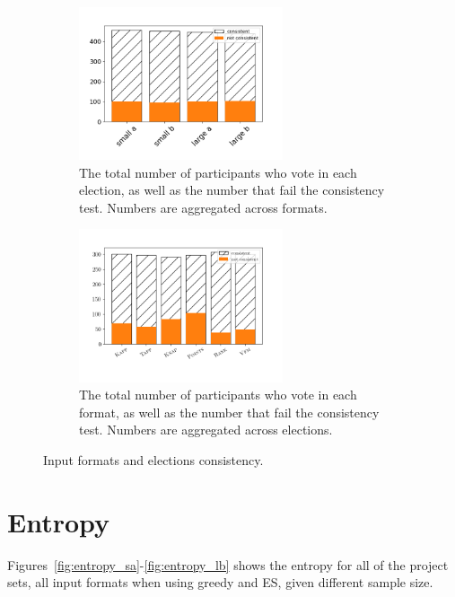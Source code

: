 \documentclass{comsoc2023}
\newcommand{\mes}{ES}
\begin{document}
\begin{figure}[ht!]
     \centering
          \begin{subfigure}[b]{0.45\textwidth}
         \centering
       \includegraphics[width=6cm]{experiment/election_consistency.png}
\caption{The total number of  participants who vote in each election, as well as the number that fail the consistency test.  Numbers are aggregated across formats.
}\label{fig:consistency_elections}
     \end{subfigure}\hfill
     \begin{subfigure}[b]{0.45\textwidth}
         \centering
         \includegraphics[width=6cm]{experiment/format_consistency.png}
\caption{The total number of  participants who vote in each format, as well as the number that fail the consistency test.  Numbers are aggregated across elections.
}\label{fig:consistency}
     \end{subfigure}
        \caption{Input formats and elections consistency.}
        \label{fig:all_consistency}
\end{figure}


\section{Entropy}\label{app:entropy}
Figures~\ref{fig:entropy_sa}-\ref{fig:entropy_lb}  shows the entropy for all of the project sets, all input formats when using greedy and \mes{}, given different sample size. 
\end{document}
